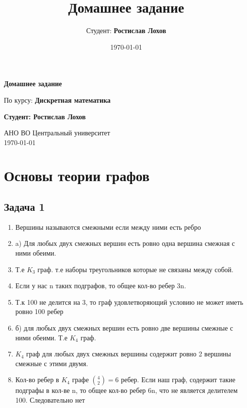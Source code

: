 \documentclass[a4paper,12pt]{article}
\title{Домашнее задание}
\author{Студент: \textbf{Ростислав Лохов}}
\date{\today}
\begin{document}
\begin{titlepage}
    \centering
    \vspace*{1cm}

    \Huge
    \textbf{Домашнее задание}

    \vspace{0.5cm}
    \LARGE
    По курсу: \textbf{Дискретная математика}

    \vspace{1.5cm}

    \textbf{Студент: Ростислав Лохов}

    \vfill

    \Large
    АНО ВО Центральный университет\\
    \vspace{0.3cm}
    \today

\end{titlepage}

\tableofcontents
\newpage

\section{Основы теории графов}

\subsection{Задача 1}
\begin{enumerate}
    \item Вершины называются смежными если между ними есть ребро
    \item a) Для любых двух смежных вершин есть ровно одна вершина смежная с ними обеими. 
    \item Т.е $K_3$ граф. т.е наборы треугольников которые не связаны между собой. 
    \item Если у нас n таких подграфов, то общее кол-во ребер 3n. 
    \item Т.к 100 не делится на 3, то граф удовлетворяющий условию не может иметь ровно 100 ребер
    \item б) для любых двух смежных вершин есть ровно две вершины смежные с ними обеими. Т.е $K_4$ граф.
    \item $K_4$ граф для любых двух смежных вершины содержит ровно 2 вершины смежные с этими двумя.
    \item Кол-во ребер в $K_4$ графе $\binom{4}{2}=6$ ребер. Если наш граф, содержит такие подграфы в кол-ве n, то общее кол-во ребер 6n, что не является делителем 100. Следовательно нет
\end{enumerate}
\end{document}
